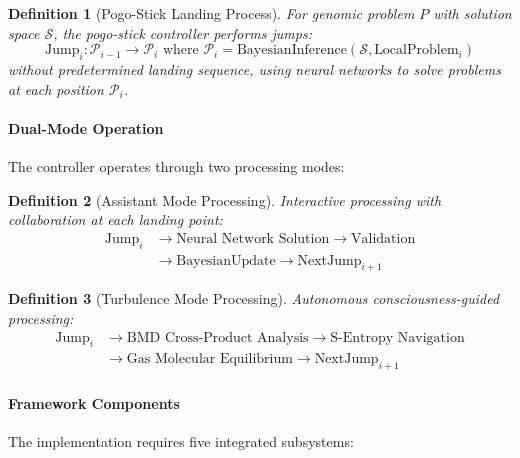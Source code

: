 \documentclass[12pt,a4paper]{article}
\newtheorem{definition}{Definition}
\begin{document}
\begin{definition}[Pogo-Stick Landing Process]
For genomic problem $P$ with solution space $\mathcal{S}$, the pogo-stick controller performs jumps:
\begin{equation}
\text{Jump}_i: \mathcal{P}_{i-1} \rightarrow \mathcal{P}_i \text{ where } \mathcal{P}_i = \text{BayesianInference}(\mathcal{S}, \text{LocalProblem}_i)
\end{equation}
without predetermined landing sequence, using neural networks to solve problems at each position $\mathcal{P}_i$.
\end{definition}

\paragraph{Dual-Mode Operation}

The controller operates through two processing modes:

\begin{definition}[Assistant Mode Processing]
Interactive processing with collaboration at each landing point:
\begin{align}
\text{Jump}_i &\rightarrow \text{Neural Network Solution} \rightarrow \text{Validation} \\
&\rightarrow \text{BayesianUpdate} \rightarrow \text{NextJump}_{i+1}
\end{align}
\end{definition}

\begin{definition}[Turbulence Mode Processing]  
Autonomous consciousness-guided processing:
\begin{align}
\text{Jump}_i &\rightarrow \text{BMD Cross-Product Analysis} \rightarrow \text{S-Entropy Navigation} \\
&\rightarrow \text{Gas Molecular Equilibrium} \rightarrow \text{NextJump}_{i+1}
\end{align}
\end{definition}

\paragraph{Framework Components}

The implementation requires five integrated subsystems:
\end{document}
